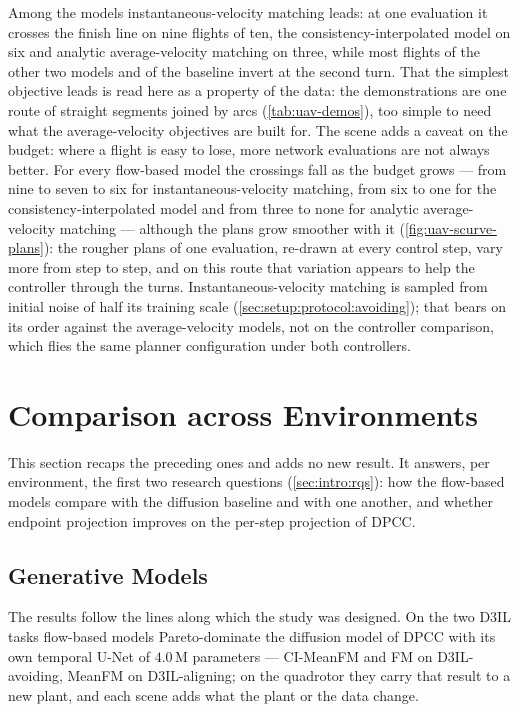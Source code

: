 Among the models instantaneous-velocity matching leads: at one evaluation it crosses the finish line on
nine flights of ten, the consistency-interpolated model on six and analytic average-velocity matching on
three, while most flights of the other two models and of the baseline invert at the second turn. That the
simplest objective leads is read here as a property of the data: the demonstrations are one route of straight segments
joined by arcs (\autoref{tab:uav-demos}), too simple to need what the average-velocity objectives are built
for. The scene adds a caveat on the budget: where a flight is easy to lose, more network evaluations are not
always better. For every flow-based model the crossings fall as the budget grows --- from nine to seven to
six for instantaneous-velocity matching, from six to one for the consistency-interpolated model and from
three to none for analytic average-velocity matching --- although the plans grow smoother with it
(\autoref{fig:uav-scurve-plans}): the rougher plans of one evaluation, re-drawn at every control step, vary
more from step to step, and on this route that variation appears to help the controller through the turns.
Instantaneous-velocity matching is sampled from initial noise of half its training scale
(\autoref{sec:setup:protocol:avoiding}); that bears on its order against the average-velocity models, not on
the controller comparison, which flies the same planner configuration under both controllers.

\section{Comparison across Environments}\label{sec:res:summary}

This section recaps the preceding ones and adds no new result. It answers, per environment, the first two
research questions (\autoref{sec:intro:rqs}): how the flow-based models compare with the diffusion baseline
and with one another, and whether endpoint projection improves on the per-step projection of \ac{DPCC}.

\subsection{Generative Models}\label{sec:res:summary:models}

The results follow the lines along which the study was designed. On the two D3IL tasks flow-based models
Pareto-dominate the diffusion model of \ac{DPCC} with its own temporal U-Net of $4.0$\,M parameters ---
CI-MeanFM and FM on D3IL-avoiding, MeanFM on D3IL-aligning; on the quadrotor they carry that result to a
new plant, and each scene adds what the plant or the data change.

